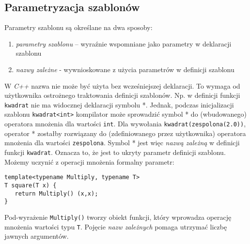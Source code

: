 \documentclass[11pt, a4paper]{article}
\begin{document}
\lstset{language=C++}

\subsection{Parametryzacja szablonów}

Parametry szablonu są określane na dwa sposoby:

\begin{enumerate}

\item \emph{parametry szablonu} – wyraźnie wspomniane jako parametry w deklaracji szablonu

\item \emph{nazwy zależne} - wywnioskowane z użycia parametrów w definicji szablonu

\end{enumerate}

W \emph{C++} nazwa nie może być użyta bez wcześniejszej deklaracji. To wymaga od użytkownika ostrożnego traktowania definicji szablonów. Np. w definicji funkcji \verb#kwadrat# nie ma widocznej deklaracji symbolu *. Jednak, podczas inicjalizacji szablonu \verb#kwadrat<int># kompilator może sprowadzić symbol * do (wbudowanego) operatora mnożenia dla wartości \verb#int#. Dla wywołania \verb#kwadrat(zespolona(2.0))#, operator * zostałby rozwiązany do (zdefiniowanego przez użytkownika) operatora mnożenia dla wartości \verb#zespolona#. Symbol * jest więc \emph{nazwą zależną} w definicji funkcji \verb#kwadrat#. Oznacza to, że jest to ukryty parametr definicji szablonu. Możemy uczynić z operacji mnożenia formalny parametr:

\begin{lstlisting}[frame=single]
template<typename Multiply, typename T>
T square(T x) {
   return Multiply() (x,x);
}
\end{lstlisting}

Pod-wyrażenie \verb#Multiply()# tworzy obiekt funkcji, który wprowadza operację mnożenia wartości typu \verb#T#. Pojęcie \emph{nazw zależnych} pomaga utrzymać liczbę jawnych argumentów.
\end{document}
